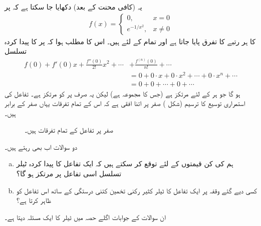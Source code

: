 یہ (کافی محنت کے بعد) دکھایا جا سکتا ہے کہ  پر
 \begin{align*}
f(x)=
\begin{cases}
0,&x=0\\
e^{-1/x^2},&x\ne 0
\end{cases}
\end{align*}
کا ہر رتبے کا تفرق پایا جاتا ہے اور تمام  کے لئے  ہیں۔ اس کا مطلب ہوا کہ  پر  کا پیدا کردہ تسلسل
\begin{align*}
f(0)+f'(0)x+\frac{f''(0)}{2!}x^2+\cdots &+\frac{f^{(n)}(0)}{n!}+\cdots\\
&=0+0\cdot x+0\cdot x^2+\cdots+0\cdot x^n+\cdots\\
&=0+0+\cdots+0+\cdots
\end{align*}
ہو گا جو ہر  کے لئے مرتکز ہے (جس کا مجموعہ  ہے) لیکن یہ صرف  پر  کو مرتکز ہے۔  تفاعل  کی استمراری توسیع کا ترسیم (شکل ) صفر پر اتنا افقی ہے کہ اس کے تمام تفرقات یہاں صفر کے برابر ہیں۔
\begin{figure}
\centering
{}
\caption{صفر پر تفاعل کے تمام تفرقات  ہیں۔}
\label{شکل_مثال_تسلسل_مرکوز_لیکن_تفاعل_کو_نہیں}
\end{figure}


دو سوالات اب بھی رہتے ہیں۔
\begin{enumerate}[a.]
\item
ہم  کی کن قیمتوں کے لئے توقع کر سکتے ہیں کہ ایک تفاعل کا پیدا کردہ ٹیلر تسلسل اسی تفاعل پر مرتکز ہو گا؟
\item
کسی دیے گئے وقفہ پر ایک تفاعل  کا ٹیلر کثیر رکنی تخمین کتنی درستگی کے ساتھ اس تفاعل کو ظاہر کرتا ہے؟
\end{enumerate} 

ان سوالات کے جوابات اگلے حصہ میں ٹیلر کا ایک مسئلہ دیتا ہے۔
